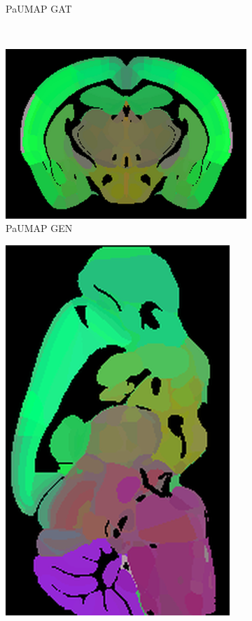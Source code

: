 \documentclass[]{article}
\begin{document}
\begin{figure}
\begin{subfigure}{.176\textwidth}
		\caption{PaUMAP GAT}
		\label{fig:ParaUMAP_GAT_sag}
	\end{subfigure}\\

	\begin{subfigure}{.25\textwidth}
		\centering
		\includegraphics[width=.9\linewidth]{../results/para_umap_GEN_ano_coronal_50_res_slice_1.png}
		\caption{PaUMAP GEN}
		\label{fig:ParaUMAP_GEN_cor}
	\end{subfigure}
	\begin{subfigure}{.176\textwidth}
		\centering
		\includegraphics[width=.9\linewidth, angle=270]{../results/para_umap_GEN_ano_sagittal_50_res_slice_1.png}

\end{subfigure}
\end{figure}
\end{document}
